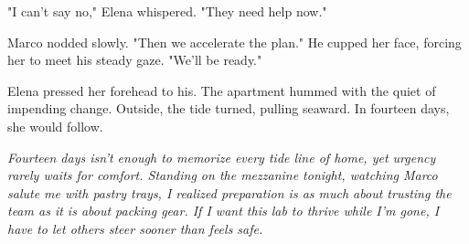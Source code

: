"I can't say no," Elena whispered. "They need help now."

Marco nodded slowly. "Then we accelerate the plan." He cupped her face, forcing her to meet his steady gaze. "We'll be ready."

Elena pressed her forehead to his. The apartment hummed with the quiet of impending change. Outside, the tide turned, pulling seaward. In fourteen days, she would follow.

\noindent\textit{Fourteen days isn't enough to memorize every tide line of home, yet urgency rarely waits for comfort. Standing on the mezzanine tonight, watching Marco salute me with pastry trays, I realized preparation is as much about trusting the team as it is about packing gear. If I want this lab to thrive while I'm gone, I have to let others steer sooner than feels safe.}
